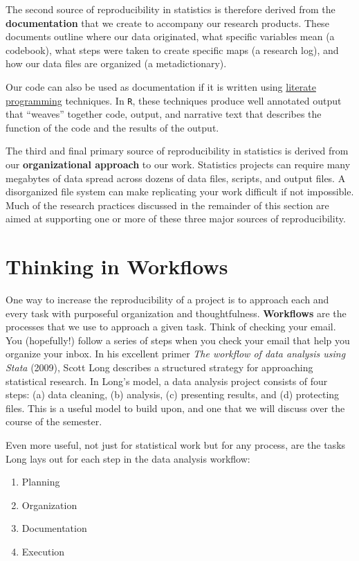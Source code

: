\documentclass[]{book}
\providecommand{\tightlist}{%
  \setlength{\itemsep}{0pt}\setlength{\parskip}{0pt}}
\theoremstyle{definition}
\theoremstyle{definition}
\theoremstyle{definition}
\theoremstyle{remark}
\begin{document}
The second source of reproducibility in statistics is therefore derived
from the \textbf{documentation} that we create to accompany our research
products. These documents outline where our data originated, what
specific variables mean (a codebook), what steps were taken to create
specific maps (a research log), and how our data files are organized (a
metadictionary).

Our code can also be used as documentation if it is written using
\href{https://en.wikipedia.org/wiki/Literate_programming}{literate
programming} techniques. In \texttt{R}, these techniques produce well
annotated output that ``weaves'' together code, output, and narrative
text that describes the function of the code and the results of the
output.

The third and final primary source of reproducibility in statistics is
derived from our \textbf{organizational approach} to our work.
Statistics projects can require many megabytes of data spread across
dozens of data files, scripts, and output files. A disorganized file
system can make replicating your work difficult if not impossible. Much
of the research practices discussed in the remainder of this section are
aimed at supporting one or more of these three major sources of
reproducibility.

\section{Thinking in Workflows}\label{thinking-in-workflows}

One way to increase the reproducibility of a project is to approach each
and every task with purposeful organization and thoughtfulness.
\textbf{Workflows} are the processes that we use to approach a given
task. Think of checking your email. You (hopefully!) follow a series of
steps when you check your email that help you organize your inbox. In
his excellent primer \emph{The workflow of data analysis using Stata}
(2009), Scott Long describes a structured strategy for approaching
statistical research. In Long's model, a data analysis project consists
of four steps: (a) data cleaning, (b) analysis, (c) presenting results,
and (d) protecting files. This is a useful model to build upon, and one
that we will discuss over the course of the semester.

Even more useful, not just for statistical work but for any process, are
the tasks Long lays out for each step in the data analysis workflow:

\begin{enumerate}
\def\labelenumi{\arabic{enumi}.}
\tightlist
\item
  Planning
\item
  Organization
\item
  Documentation
\item
  Execution
\end{enumerate}
\end{document}
